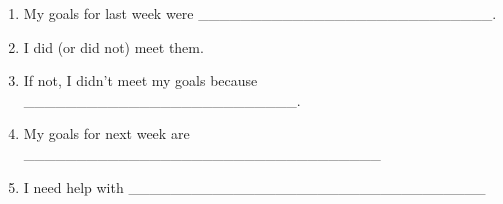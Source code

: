 \documentclass[]{article}
\begin{document}
\begin{longtable}[]{@{}clll@{}}
\begin{minipage}[t]{0.04\columnwidth}\centering\strut
\strut
\end{minipage} & \begin{minipage}[t]{0.24\columnwidth}\raggedright\strut
\strut
\end{minipage} & \begin{minipage}[t]{0.33\columnwidth}\raggedright\strut
\strut
\end{minipage} & \begin{minipage}[t]{0.28\columnwidth}\raggedright\strut
\strut
\end{minipage}\tabularnewline
\bottomrule
\end{longtable}

\begin{enumerate}
\def\labelenumi{\arabic{enumi})}
\item
  My goals for last week were
  \_\_\_\_\_\_\_\_\_\_\_\_\_\_\_\_\_\_\_\_\_\_\_\_\_\_\_\_.
\item
  I did (or did not) meet them.
\item
  If not, I didn't meet my goals because
  \_\_\_\_\_\_\_\_\_\_\_\_\_\_\_\_\_\_\_\_\_\_\_\_\_\_.
\item
  My goals for next week are
  \_\_\_\_\_\_\_\_\_\_\_\_\_\_\_\_\_\_\_\_\_\_\_\_\_\_\_\_\_\_\_\_\_\_
\item
  I need help with
  \_\_\_\_\_\_\_\_\_\_\_\_\_\_\_\_\_\_\_\_\_\_\_\_\_\_\_\_\_\_\_\_\_\_
\end{enumerate}
\end{document}

